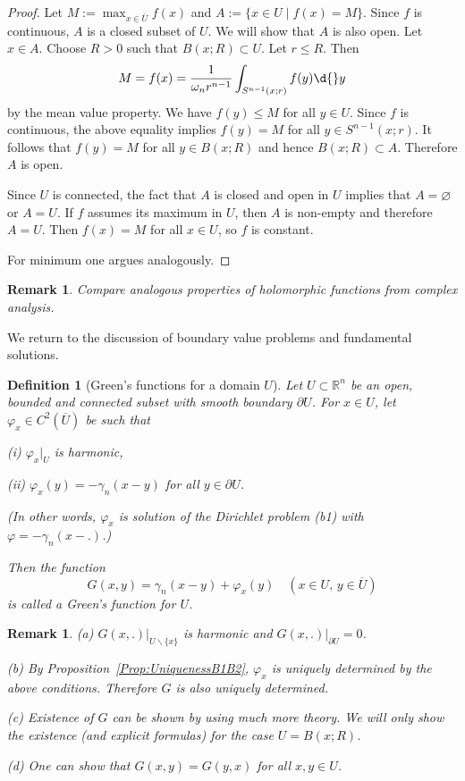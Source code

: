 \documentclass[12pt, oneside, a4paper]{article}
\theoremstyle{dfn}
\newtheorem{dfn}[thm]{Definition}
\newtheorem{rem}[thm]{Remark}
\def\Rbb{\ensuremath{\mathbb{R}}}
\renewcommand{\phi}{\varphi}
\begin{document}
\begin{proof}
Let $M:= \max_{x \in \overline{U}} f(x)$ and $A:= \{ x \in U \mid f(x) = M\}$. Since $f$ is continuous, $A$ is a closed subset of $U$. We will show that $A$ is also open. Let $x \in A$. Choose $R > 0$ such that $B(x;R) \subset U$. Let $r \leqslant R$. Then
\[
M = f(x) = \frac{1}{\omega_n r^{n-1}} \int_{S^{n-1}(x;r)} f(y) \d{}y
\]
by the mean value property. We have $f(y) \leqslant M$ for all $y \in U$. Since $f$ is continuous, the above equality implies $f(y) = M$ for all $y \in S^{n-1}(x;r)$. It follows that $f(y) = M$ for all $y \in B(x;R)$ and hence $B(x;R) \subset A$. Therefore $A$ is open.

Since $U$ is connected, the fact that $A$ is closed and open in $U$ implies that $A = \varnothing$ or $A = U$. If $f$ assumes its maximum in $U$, then $A$ is non-empty and therefore $A = U$. Then $f(x) = M$ for all $x \in U$, so $f$ is constant.

For minimum one argues analogously.
\end{proof}

\begin{rem}
Compare analogous properties of holomorphic functions from complex analysis.
\end{rem}

We return to the discussion of boundary value problems and fundamental solutions.

\begin{dfn}[Green's functions for a domain $U$]
Let $U \subset \Rbb^n$ be an open, bounded and connected subset with smooth boundary $\partial U$. For $x \in U$, let $\phi_x \in C^2(\overline{U})$ be such that

(i) $\phi_x|_U$ is harmonic,

(ii) $\phi_x(y) = -\gamma_n(x-y)$ for all $y \in \partial U$.

\noindent (In other words, $\phi_x$ is solution of the Dirichlet problem (b1) with $\varphi = - \gamma_n(x-.)$.)

Then the function
\[
G(x,y) = \gamma_n(x-y) + \phi_x(y) \quad(x \in U, \, y \in \overline{U})
\]
is called a Green's function for $U$.
\end{dfn}

\begin{rem}
(a) $G(x,.)|_{U \smallsetminus \{ x \}}$ is harmonic and $G(x,.)|_{\partial U} = 0$.

(b) By Proposition~\ref{Prop:UniquenessB1B2}, $\phi_x$ is uniquely determined by the above conditions. Therefore $G$ is also uniquely determined.

(c) Existence of $G$ can be shown by using much more theory. We will only show the existence (and explicit formulas) for the case $U = B(x;R)$.

(d) One can show that $G(x,y) = G(y,x)$ for all $x,y \in U$.
\end{rem}
\end{document}

